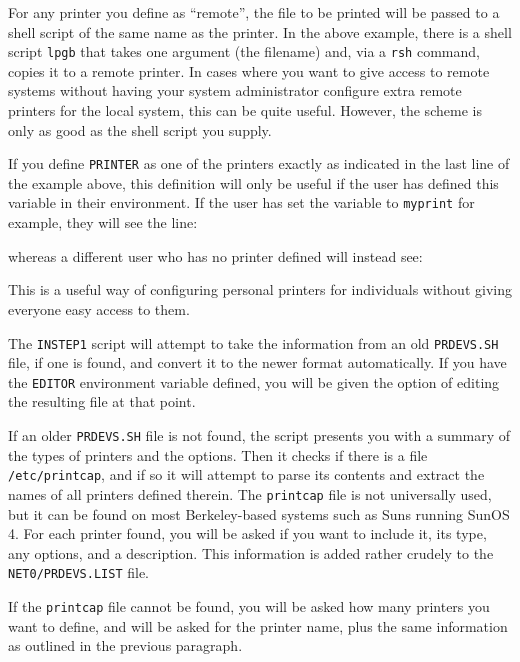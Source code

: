 For any printer you define as ``remote'', the file to be printed will be
passed to a shell script of the same name as the printer.  In the above
example, there is a shell script {\tt lpgb} that takes one argument (the
filename) and, via a {\tt rsh} command, copies it to a remote printer.  In
cases where you want to give access to remote systems without having your
system administrator configure extra remote printers for the local system,
this can be quite useful.  However, the scheme is only as good as the
shell script you supply.

If you define {\tt\dol PRINTER} as one of the printers exactly as
indicated in the last line of the example above, this definition will only
be useful if the user has defined this variable in their environment.  If
the user has set the variable to {\tt myprint} for example, they will see
the line:\medskip

\medskip

\noindent whereas a different user who has no printer defined will instead
see:\medskip

\medskip

\noindent This is a useful way of configuring personal printers for
individuals without giving everyone easy access to them.

The {\tt INSTEP1} script will attempt to take the information from an old
{\tt PRDEVS.SH} file, if one is found, and convert it to the newer format
automatically.  If you have the {\tt EDITOR} environment variable defined,
you will be given the option of editing the resulting file at that point.

If an older {\tt PRDEVS.SH} file is not found, the script presents you
with a summary of the types of printers and the options.  Then it checks
if there is a file {\tt /etc/printcap}, and if so it will attempt to parse
its contents and extract the names of all printers defined therein.  The
{\tt printcap} file is not universally used, but it can be found on
most Berkeley-based systems such as Suns running SunOS 4.  For each
printer found, you will be asked if you want to include it, its type, any
options, and a description.  This information is added rather crudely to
the {\tt\dol NET0/PRDEVS.LIST} file.

If the {\tt printcap} file cannot be found, you will be asked how many
printers you want to define, and will be asked for the printer name, plus
the same information as outlined in the previous paragraph.

